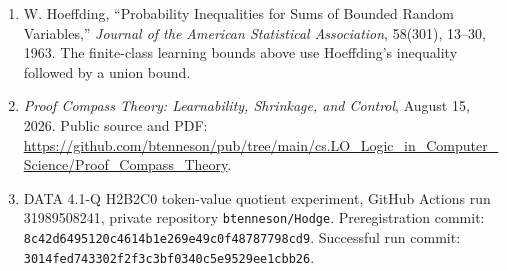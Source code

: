 \documentclass[11pt]{article}
\begin{document}
\begin{enumerate}[leftmargin=2.0em]
\item W. Hoeffding, ``Probability Inequalities for Sums of Bounded Random Variables,'' \emph{Journal of the American Statistical Association}, 58(301), 13--30, 1963. The finite-class learning bounds above use Hoeffding's inequality followed by a union bound.
\item \emph{Proof Compass Theory: Learnability, Shrinkage, and Control}, August 15, 2026. Public source and PDF: \url{https://github.com/btenneson/pub/tree/main/cs.LO_Logic_in_Computer_Science/Proof_Compass_Theory}.
\item DATA 4.1-Q H2B2C0 token-value quotient experiment, GitHub Actions run 31989508241, private repository \texttt{btenneson/Hodge}. Preregistration commit: \texttt{8c42d6495120c4614b1e269e49c0f48787798cd9}. Successful run commit: \texttt{3014fed743302f2f3c3bf0340c5e9529ee1cbb26}.
\end{enumerate}
\end{document}
